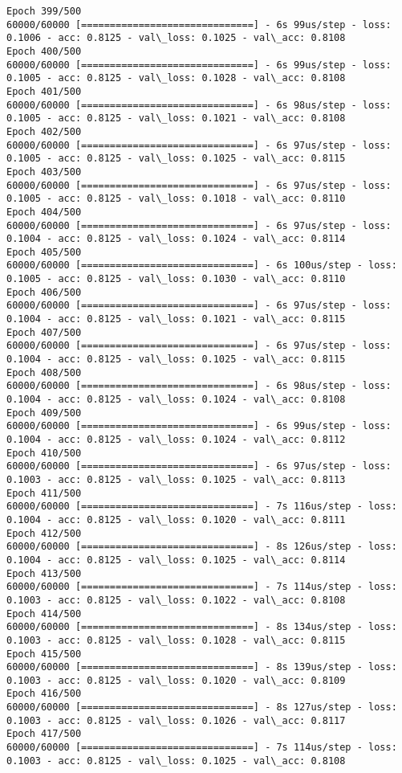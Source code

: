 \documentclass[11pt]{article}
\begin{document}
\begin{Verbatim}[commandchars=\\\{\}]
Epoch 399/500
60000/60000 [==============================] - 6s 99us/step - loss: 0.1006 - acc: 0.8125 - val\_loss: 0.1025 - val\_acc: 0.8108
Epoch 400/500
60000/60000 [==============================] - 6s 99us/step - loss: 0.1005 - acc: 0.8125 - val\_loss: 0.1028 - val\_acc: 0.8108
Epoch 401/500
60000/60000 [==============================] - 6s 98us/step - loss: 0.1005 - acc: 0.8125 - val\_loss: 0.1021 - val\_acc: 0.8108
Epoch 402/500
60000/60000 [==============================] - 6s 97us/step - loss: 0.1005 - acc: 0.8125 - val\_loss: 0.1025 - val\_acc: 0.8115
Epoch 403/500
60000/60000 [==============================] - 6s 97us/step - loss: 0.1005 - acc: 0.8125 - val\_loss: 0.1018 - val\_acc: 0.8110
Epoch 404/500
60000/60000 [==============================] - 6s 97us/step - loss: 0.1004 - acc: 0.8125 - val\_loss: 0.1024 - val\_acc: 0.8114
Epoch 405/500
60000/60000 [==============================] - 6s 100us/step - loss: 0.1005 - acc: 0.8125 - val\_loss: 0.1030 - val\_acc: 0.8110
Epoch 406/500
60000/60000 [==============================] - 6s 97us/step - loss: 0.1004 - acc: 0.8125 - val\_loss: 0.1021 - val\_acc: 0.8115
Epoch 407/500
60000/60000 [==============================] - 6s 97us/step - loss: 0.1004 - acc: 0.8125 - val\_loss: 0.1025 - val\_acc: 0.8115
Epoch 408/500
60000/60000 [==============================] - 6s 98us/step - loss: 0.1004 - acc: 0.8125 - val\_loss: 0.1024 - val\_acc: 0.8108
Epoch 409/500
60000/60000 [==============================] - 6s 99us/step - loss: 0.1004 - acc: 0.8125 - val\_loss: 0.1024 - val\_acc: 0.8112
Epoch 410/500
60000/60000 [==============================] - 6s 97us/step - loss: 0.1003 - acc: 0.8125 - val\_loss: 0.1025 - val\_acc: 0.8113
Epoch 411/500
60000/60000 [==============================] - 7s 116us/step - loss: 0.1004 - acc: 0.8125 - val\_loss: 0.1020 - val\_acc: 0.8111
Epoch 412/500
60000/60000 [==============================] - 8s 126us/step - loss: 0.1004 - acc: 0.8125 - val\_loss: 0.1025 - val\_acc: 0.8114
Epoch 413/500
60000/60000 [==============================] - 7s 114us/step - loss: 0.1003 - acc: 0.8125 - val\_loss: 0.1022 - val\_acc: 0.8108
Epoch 414/500
60000/60000 [==============================] - 8s 134us/step - loss: 0.1003 - acc: 0.8125 - val\_loss: 0.1028 - val\_acc: 0.8115
Epoch 415/500
60000/60000 [==============================] - 8s 139us/step - loss: 0.1003 - acc: 0.8125 - val\_loss: 0.1020 - val\_acc: 0.8109
Epoch 416/500
60000/60000 [==============================] - 8s 127us/step - loss: 0.1003 - acc: 0.8125 - val\_loss: 0.1026 - val\_acc: 0.8117
Epoch 417/500
60000/60000 [==============================] - 7s 114us/step - loss: 0.1003 - acc: 0.8125 - val\_loss: 0.1025 - val\_acc: 0.8108

\end{Verbatim}
\end{document}
